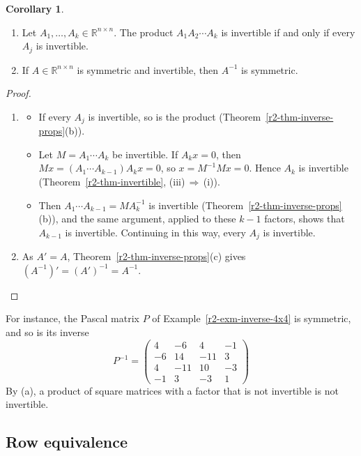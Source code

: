 \documentclass[12pt]{article}
\newcommand{\R}{\mathbb R}
\theoremstyle{definition}
\newtheorem{corollary}[theorem]{Corollary}
\begin{document}
\begin{corollary}\label{r2-cor-products}
\begin{enumerate}
\item Let \(A_1,\dots,A_k\in\R^{n\times n}\). The product \(A_1A_2\cdots A_k\) is invertible if and only if every
\(A_j\) is invertible.
\item If \(A\in\R^{n\times n}\) is symmetric and invertible, then \(A^{-1}\) is symmetric.
\end{enumerate}
\end{corollary}
\begin{proof}
\begin{enumerate}
\item
\begin{itemize}
\item If every \(A_j\) is invertible, so is the product (Theorem~\ref{r2-thm-inverse-props}(b)).
\item Let \(M=A_1\cdots A_k\) be invertible. If \(A_kx=0\), then \(Mx=(A_1\cdots A_{k-1})A_kx=0\), so
\(x=M^{-1}Mx=0\). Hence \(A_k\) is invertible (Theorem~\ref{r2-thm-invertible}, (iii)\,\(\Rightarrow\)\,(i)).
\item Then \(A_1\cdots A_{k-1}=MA_k^{-1}\) is invertible (Theorem~\ref{r2-thm-inverse-props}(b)), and the same
argument, applied to these \(k-1\) factors, shows that \(A_{k-1}\) is invertible. Continuing in this way, every
\(A_j\) is invertible.
\end{itemize}
\item As \(A'=A\), Theorem~\ref{r2-thm-inverse-props}(c) gives \((A^{-1})'=(A')^{-1}=A^{-1}\).\qedhere
\end{enumerate}
\end{proof}
For instance, the Pascal matrix \(P\) of Example~\ref{r2-exm-inverse-4x4} is symmetric, and so is its inverse
\[
P^{-1}=\begin{pmatrix}4&-6&4&-1\\-6&14&-11&3\\4&-11&10&-3\\-1&3&-3&1\end{pmatrix}
\]
By (a), a product of square matrices with a factor that is not invertible is not invertible.

\subsection*{Row equivalence}
\end{document}
